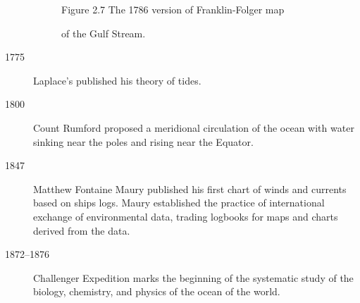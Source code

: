 \begin{description}
\begin{figure}[t!]
\centering
\footnotesize
Figure 2.7 The 1786 version of Franklin-Folger map \rule{0mm}{3ex}of
the Gulf Stream.
\label{fig:Fig2-7}
\vspace{-2ex}
\end{figure}

\vspace{-1.0ex} 
\item[1775] Laplace's published his theory of
  tides. \vspace{-1.0ex} \item[1800] Count Rumford proposed a
  meridional circulation of
  the ocean with water sinking near the poles and rising near the
  Equator. \vspace{-1.0ex}

\item[1847] Matthew Fontaine Maury published his first chart of winds
  and currents based on ships logs. Maury established the practice of
  international exchange of environmental data, trading logbooks for
  maps and charts derived from the data. \vspace{-1.0ex}

\item[1872--1876] Challenger Expedition marks the beginning of the
  systematic study of the biology, chemistry, and physics of the ocean
  of the world. \vspace{-1.0ex}


\end{description}
